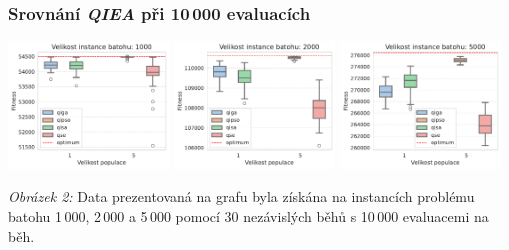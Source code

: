 \begin{frame}
  \frametitle{Srovnání \emph{QIEA} při 10\,000 evaluacích}
    \includegraphics[width=0.32\textwidth]{img/10000/best_all_qiea_1000.pdf}
    \includegraphics[width=0.32\textwidth]{img/10000/best_all_qiea_2000.pdf}
    \includegraphics[width=0.32\textwidth]{img/10000/best_all_qiea_5000.pdf}

    \vspace{0.5em}
    \scriptsize
    \centering
    \emph{Obrázek 2:} Data prezentovaná na grafu byla získána na instancích problému batohu 1\,000, 2\,000 a 5\,000 pomocí 30 nezávislých běhů s 10\,000 evaluacemi na běh.
\end{frame}


